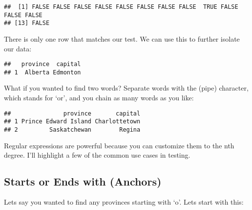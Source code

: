 \documentclass[
]{book}
\newenvironment{Shaded}{\begin{snugshade}}{\end{snugshade}}
\newcommand{\KeywordTok}[1]{\textcolor[rgb]{0.13,0.29,0.53}{\textbf{#1}}}
\newcommand{\NormalTok}[1]{#1}
\newcommand{\OperatorTok}[1]{\textcolor[rgb]{0.81,0.36,0.00}{\textbf{#1}}}
\newcommand{\StringTok}[1]{\textcolor[rgb]{0.31,0.60,0.02}{#1}}
\begin{document}
\begin{verbatim}
##  [1] FALSE FALSE FALSE FALSE FALSE FALSE FALSE FALSE  TRUE FALSE FALSE FALSE
## [13] FALSE
\end{verbatim}

There is only one row that matches our test. We can use this to further isolate our data:

\begin{Shaded}
\end{Shaded}

\begin{verbatim}
##   province  capital
## 1  Alberta Edmonton
\end{verbatim}

What if you wanted to find two words? Separate words with the \texttt{\textbar{}} (pipe) character, which stands for `or', and you chain as many words as you like:

\begin{Shaded}
\end{Shaded}

\begin{verbatim}
##               province       capital
## 1 Prince Edward Island Charlottetown
## 2         Saskatchewan        Regina
\end{verbatim}

Regular expressions are powerful because you can customize them to the nth degree. I'll highlight a few of the common use cases in testing.

\hypertarget{starts-or-ends-with-anchors}{%
\subsection{Starts or Ends with (Anchors)}\label{starts-or-ends-with-anchors}}

Lets say you wanted to find any provinces starting with `o'. Lets start with this:

\begin{Shaded}
\end{Shaded}
\end{document}
